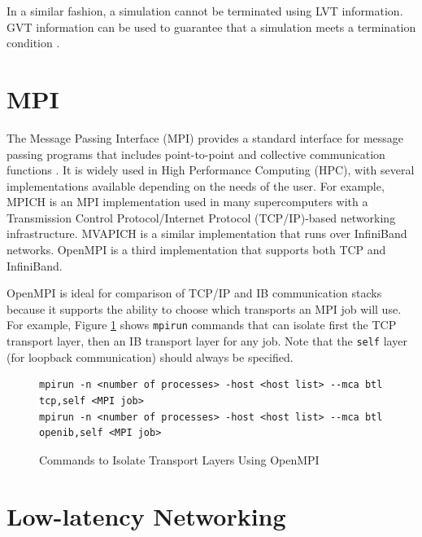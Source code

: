 \documentclass[11pt]{book}
\begin{document}
In a similar fashion, a simulation cannot be terminated using LVT information.  GVT
information can be used to guarantee that a simulation meets a termination condition
\cite{jefferson-85}.

\section{MPI}

The Message Passing Interface (MPI) provides a standard interface for message passing
programs that includes point-to-point and collective communication functions
\cite{mpi-12}.  It is widely used in High Performance Computing (HPC), with several
implementations available depending on the needs of the user.  For example, MPICH
\cite{mpich} is an MPI implementation used in many supercomputers with a Transmission
Control Protocol/Internet Protocol (TCP/IP)-based networking infrastructure.  MVAPICH
\cite{mvapich} is a similar implementation that runs over InfiniBand networks.  OpenMPI
\cite{openmpi} is a third implementation that supports both TCP and InfiniBand.

OpenMPI is ideal for comparison of TCP/IP and IB communication stacks because it supports
the ability to choose which transports an MPI job will use.  For example, Figure
\ref{ompi-btl} shows \verb;mpirun; commands that can isolate first the TCP transport
layer, then an IB transport layer for any job.  Note that the \verb;self; layer (for
loopback communication) should always be specified.

\begin{figure}
\centering
\begin{verbatim}
mpirun -n <number of processes> -host <host list> --mca btl tcp,self <MPI job>
mpirun -n <number of processes> -host <host list> --mca btl openib,self <MPI job>
\end{verbatim}
\caption{Commands to Isolate Transport Layers Using OpenMPI}\label{ompi-btl}
\end{figure}

\section{Low-latency Networking}


\end{document}
